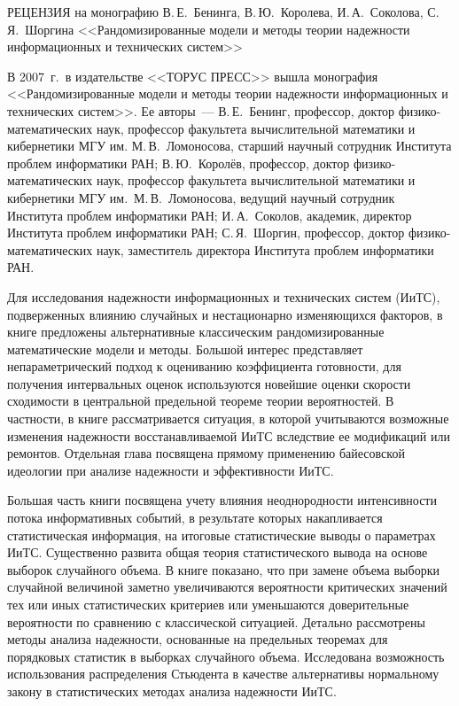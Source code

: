      РЕЦЕНЗИЯ
     на монографию В.\,Е.~Бенинга, В.\,Ю.~Королева, И.\,А.~Соколова, С.\,Я.~Шоргина
     <<Рандомизированные модели и методы теории надежности информационных и 
технических систем>>
     
     В 2007~г.\ в издательстве <<ТОРУС ПРЕСС>> вышла монография <<Рандомизированные 
модели и методы теории надежности информационных и технических систем>>. Ее авторы~--- 
В.\,Е.~Бенинг, профессор, доктор физико-математических наук, профессор факультета 
вычислительной математики и кибернетики МГУ им. М.\,В.~Ломоносова, старший научный 
сотрудник Института проблем информатики РАН; В.\,Ю.~Королёв, профессор, доктор 
     физико-математических наук, профессор факультета вычислительной математики и 
кибернетики МГУ им.\ М.\,В.~Ломоносова, ведущий научный сотрудник Института проблем 
информатики РАН; И.\,А.~Соколов, академик, директор Института проблем информатики 
РАН; С.\,Я.~Шоргин, профессор, доктор физико-математических наук, заместитель директора 
Института проблем информатики РАН. 
     
     Для исследования надежности информационных и технических систем (ИиТС), 
подверженных влиянию случайных и нестационарно изменяющихся факторов, в книге 
предложены альтернативные классическим рандомизированные математические модели и 
методы. Большой интерес представляет непараметрический подход к оцениванию 
коэффициента готовности, для получения интервальных оценок используются новейшие 
оценки скорости сходимости в центральной предельной теореме теории вероятностей. В 
частности, в книге рассматривается ситуация, в которой учитываются возможные изменения 
надежности восстанавливаемой ИиТС вследствие ее модификаций или ремонтов. Отдельная 
глава посвящена прямому применению байесовской идеологии при анализе надежности и 
эффективности ИиТС. 
     
     Большая часть книги посвящена учету влияния неоднородности интенсивности потока 
информативных событий, в результате которых накапливается статистическая информация, на 
итоговые статистические выводы о параметрах ИиТС. Существенно развита  общая теория 
статистического вывода на основе выборок случайного объема. В книге показано, что при 
замене объема выборки случайной величиной заметно увеличиваются вероятности 
критических значений тех или иных статистических критериев или уменьшаются 
доверительные вероятности по сравнению с классической ситуацией. Детально рассмотрены 
методы анализа надежности, основанные на предельных теоремах для порядковых статистик в 
выборках случайного объема. Исследована возможность использования распределения 
Стьюдента в качестве альтернативы нормальному закону в статистических методах анализа 
надежности ИиТС. 
     
